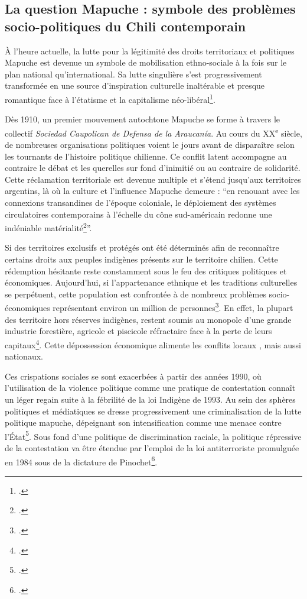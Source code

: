 	\subsection{La question Mapuche : symbole des problèmes socio-politiques du Chili contemporain}
	
	À l'heure actuelle, la lutte pour la légitimité des droits territoriaux et politiques Mapuche est devenue un symbole de mobilisation ethno-sociale à la fois sur le plan national qu'international. Sa lutte singulière s’est progressivement transformée en une source d’inspiration culturelle inaltérable et presque romantique face à l'étatisme et la capitalisme néo-libéral\footcite{sepulvedaPaysMapucheTerritoire2012}.
	
	Dès 1910, un premier mouvement autochtone Mapuche se forme à travers le collectif \textit{Sociedad Caupolican de Defensa de la Araucanía}. Au cours du XX\textsuperscript{e} siècle, de nombreuses organisations politiques voient le jours avant de disparaître selon les tournants de l'histoire politique chilienne. Ce conflit latent accompagne au contraire le débat et les querelles sur fond d'inimitié ou au contraire de solidarité. Cette réclamation territoriale est devenue multiple et s'étend jusqu'aux territoires argentins, là où la culture et l'influence Mapuche demeure : \enquote{en renouant avec les connexions transandines de l’époque coloniale, le déploiement des systèmes circulatoires contemporains à l’échelle du cône sud-américain redonne une indéniable matérialité\footcite{sepulvedaPaysMapucheTerritoire2012}}.
	
	Si des territoires exclusifs et protégés ont été déterminés afin de reconnaître certains droits aux peuples indigènes présents sur le territoire chilien. Cette rédemption hésitante reste constamment sous le feu des critiques politiques et économiques. Aujourd'hui, si l'appartenance ethnique et les traditions culturelles se perpétuent, cette population est confrontée à de nombreux problèmes socio-économiques représentant environ un million de personnes\footcite{bengoaMapuchesHistoriaCultura2011}. En effet, la plupart des territoire hors réserves indigènes, restent soumis au monopole d'une grande industrie forestière, agricole et piscicole réfractaire face à la perte de leurs capitaux\footcite{andradeLuchaPorTerritorio2019}. Cette dépossession économique alimente les conflits locaux , mais aussi nationaux.
	
	Ces crispations sociales se sont exacerbées à partir des années 1990, où l'utilisation de la violence politique comme une pratique de contestation connaît un léger regain suite à la fébrilité de la loi Indigène de 1993. Au sein des sphères politiques et médiatiques se dresse progressivement une criminalisation de la lutte politique mapuche, dépeignant son intensification comme une menace contre l'État\footcite{carvajal-delmarCriminalisationConflitMapuche2014}. Sous fond d'une politique de discrimination raciale, la politique répressive de la contestation va être étendue par l'emploi de la loi antiterroriste promulguée en 1984 sous de la dictature de Pinochet\footcite{carvajal-delmarCriminalisationConflitMapuche2014}. 
	

